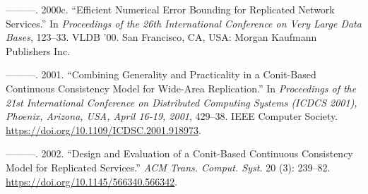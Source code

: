 \documentclass[]             %
{NASA}                       %
\newlength{\cslhangindent}
\newlength{\cslentryspacingunit} %
\newenvironment{CSLReferences}[2] %
 {%
  \setlength{\parindent}{0pt}
  \ifodd #1
  \let\oldpar\par
  \def\par{\hangindent=\cslhangindent\oldpar}
  \fi
  \setlength{\parskip}{#2\cslentryspacingunit}
 }%
 {}
\theoremstyle{definition}
\begin{document}
\begin{CSLReferences}{1}{0}
\leavevmode{}%
---------. 2000c. {``Efficient Numerical Error Bounding for Replicated
Network Services.''} In \emph{Proceedings of the 26th International
Conference on Very Large Data Bases}, 123--33. VLDB '00. San Francisco,
CA, USA: Morgan Kaufmann Publishers Inc.

\leavevmode{}%
---------. 2001. {``Combining Generality and Practicality in a
Conit-Based Continuous Consistency Model for Wide-Area Replication.''}
In \emph{Proceedings of the 21st International Conference on Distributed
Computing Systems {(ICDCS} 2001), Phoenix, Arizona, USA, April 16-19,
2001}, 429--38. {IEEE} Computer Society.
\url{https://doi.org/10.1109/ICDSC.2001.918973}.

\leavevmode{}%
---------. 2002. {``Design and Evaluation of a Conit-Based Continuous
Consistency Model for Replicated Services.''} \emph{ACM Trans. Comput.
Syst.} 20 (3): 239--82. \url{https://doi.org/10.1145/566340.566342}.

\end{CSLReferences}



\end{document}
